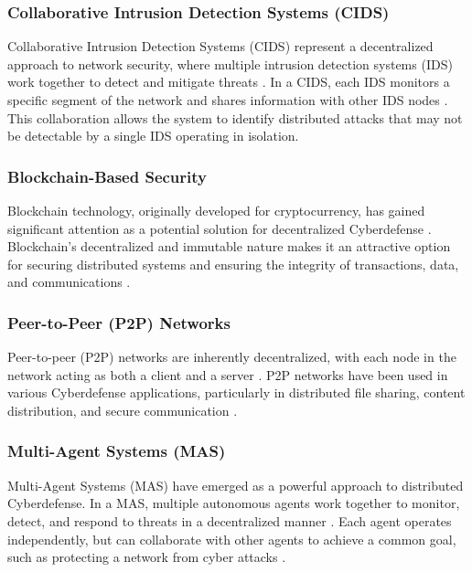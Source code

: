 \subsubsection{Collaborative Intrusion Detection Systems (CIDS)}

Collaborative Intrusion Detection Systems (CIDS) represent a decentralized approach to network security, where multiple intrusion detection systems (IDS) work together to detect and mitigate threats \cite{Zhou2010}. In a CIDS, each IDS monitors a specific segment of the network and shares information with other IDS nodes \cite{Vasilomanolakis2015}. This collaboration allows the system to identify distributed attacks that may not be detectable by a single IDS operating in isolation.

\subsubsection{Blockchain-Based Security}

Blockchain technology, originally developed for cryptocurrency, has gained significant attention as a potential solution for decentralized Cyberdefense \cite{Kshetri2017}. Blockchain's decentralized and immutable nature makes it an attractive option for securing distributed systems and ensuring the integrity of transactions, data, and communications \cite{Taylor2020}.

\subsubsection{Peer-to-Peer (P2P) Networks}

Peer-to-peer (P2P) networks are inherently decentralized, with each node in the network acting as both a client and a server \cite{Wallach2003}. P2P networks have been used in various Cyberdefense applications, particularly in distributed file sharing, content distribution, and secure communication \cite{Seedorf2009}.

\subsubsection{Multi-Agent Systems (MAS)}

Multi-Agent Systems (MAS) have emerged as a powerful approach to distributed Cyberdefense. In a MAS, multiple autonomous agents work together to monitor, detect, and respond to threats in a decentralized manner \cite{Herrero2009}. Each agent operates independently, but can collaborate with other agents to achieve a common goal, such as protecting a network from cyber attacks \cite{Jahanbin2013}.

